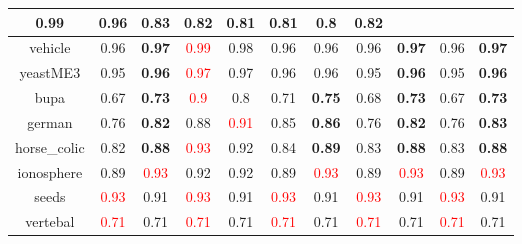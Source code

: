 \documentclass{article}%
\begin{document}
\begin{tabular}{c|cccccccccc}
{0.99
}&0.96&\textbf{0.83}&0.82&0.81&0.81&0.8&\textbf{0.82}\\%
\hline%
vehicle&0.96&\textbf{0.97}&\textcolor{red}{ 
0.99
}&0.98&0.96&0.96&0.96&\textbf{0.97}&0.96&\textbf{0.97}\\%
\hline%
yeastME3&0.95&\textbf{0.96}&\textcolor{red}{ 
0.97
}&0.97&0.96&0.96&0.95&\textbf{0.96}&0.95&\textbf{0.96}\\%
\hline%
bupa&0.67&\textbf{0.73}&\textcolor{red}{ 
0.9
}&0.8&0.71&\textbf{0.75}&0.68&\textbf{0.73}&0.67&\textbf{0.73}\\%
\hline%
german&0.76&\textbf{0.82}&0.88&\textcolor{red}{ 
0.91
}&0.85&\textbf{0.86}&0.76&\textbf{0.82}&0.76&\textbf{0.83}\\%
\hline%
horse\_colic&0.82&\textbf{0.88}&\textcolor{red}{ 
0.93
}&0.92&0.84&\textbf{0.89}&0.83&\textbf{0.88}&0.83&\textbf{0.88}\\%
\hline%
ionosphere&0.89&\textcolor{red}{ 
0.93
}&0.92&0.92&0.89&\textcolor{red}{ 
0.93
}&0.89&\textcolor{red}{ 
0.93
}&0.89&\textcolor{red}{ 
0.93
}\\%
\hline%
seeds&\textcolor{red}{ 
0.93
}&0.91&\textcolor{red}{ 
0.93
}&0.91&\textcolor{red}{ 
0.93
}&0.91&\textcolor{red}{ 
0.93
}&0.91&\textcolor{red}{ 
0.93
}&0.91\\%
\hline%
vertebal&\textcolor{red}{ 
0.71
}&0.71&\textcolor{red}{ 
0.71
}&0.71&\textcolor{red}{ 
0.71
}&0.71&\textcolor{red}{ 
0.71
}&0.71&\textcolor{red}{ 
0.71
}&0.71\\%
\hline%
\end{tabular}

%
\end{document}
